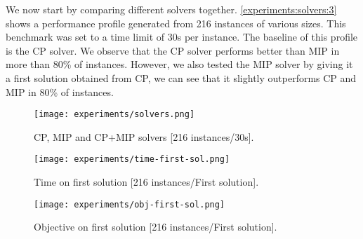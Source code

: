 \documentclass[../../thesis.tex]{subfiles}
\begin{document}
We now start by comparing different solvers together. \autoref{experiments:solvers:3} 
shows a performance profile generated from 216 instances of various sizes.
This benchmark was set to a time limit of 30s per instance. The baseline of this 
profile is the CP solver. We observe that the CP solver performs better than MIP in more than 80\% of instances.
However, we also tested the MIP solver by giving it a first solution obtained from CP, we can see that it slightly outperforms CP and MIP in 80\% of instances.

\begin{figure}
  \centering
  \texttt{[image: experiments/solvers.png]}
  \caption{CP, MIP and CP+MIP solvers [216 instances/30s].}
  \label{experiments:solvers:3}
\end{figure}


\begin{figure}
  \centering
  \texttt{[image: experiments/time-first-sol.png]}
  \caption{Time on first solution [216 instances/First solution].}
  \label{experiments:first-sol-time}
\end{figure}


\begin{figure}
  \centering
  \texttt{[image: experiments/obj-first-sol.png]}
  \caption{Objective on first solution [216 instances/First solution].}
  \label{experiments:first-sol-obj}
\end{figure}
\end{document}
